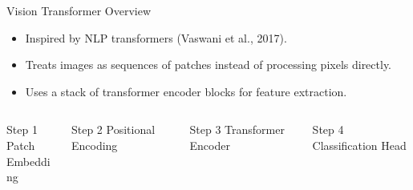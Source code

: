 \begin{frame}{Vision Transformer Overview}
  \begin{itemize}
    \item Inspired by NLP transformers (Vaswani et al., 2017).
    \item Treats images as sequences of patches instead of processing pixels directly.
    \item Uses a stack of transformer encoder blocks for feature extraction.
  \end{itemize}
  \begin{columns}
    \begin{column}{0.2\textwidth}
      \begin{block}{Step 1}
        Patch \\ Embedding
      \end{block}
    \end{column}
    \begin{column}{0.2\textwidth}
      \begin{block}{Step 2}
        Positional Encoding
      \end{block}
    \end{column}
    \begin{column}{0.2\textwidth}
      \begin{block}{Step 3}
        Transformer Encoder
      \end{block}
    \end{column}
    \begin{column}{0.2\textwidth}
      \begin{block}{Step 4}
        Classification Head
      \end{block}
    \end{column}
  \end{columns}
\end{frame}